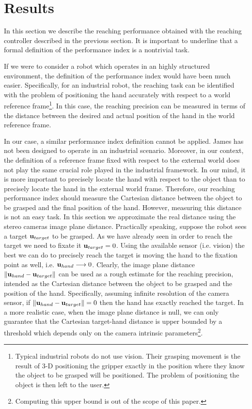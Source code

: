 \section{Results}
\label{sec:results}

In this section we describe the reaching performance obtained with 
the reaching controller described in the previous section. It is
important to underline that a formal definition of the performance 
index is a nontrivial task. 

If we were to consider a robot which operates in an highly structured
environment, the definition of the performance index would have been much easier. 
Specifically, for an industrial robot, the reaching task can be identified 
with the problem of positioning the hand accurately with respect to a world 
reference frame\footnote{Typical industrial robots do not use vision. Their 
grasping movement is the result of 3-D positioning the gripper exactly in the 
position where they know the object to be grasped will be positioned. The problem
of positioning the object is then left to the user.}. In this case, the reaching 
precision can be measured in terms of the distance between the desired and 
actual position of the hand in the world reference frame.
 
In our case, a similar performance index definition cannot be applied. James has not 
been designed to operate in an industrial scenario. Moreover, in our context, the definition of a reference 
frame fixed with respect to the external world does not play the same crucial 
role played in the industrial framework. In our mind, it is more important to 
precisely locate the hand with respect to the object than to precisely locate 
the hand in the external world frame. Therefore, our reaching performance index 
should measure the Cartesian distance between the object to be grasped and the final 
position of the hand. However, measuring this distance is not an easy task. In this section
we approximate the real distance using the stereo cameras image plane distance. Practically speaking, suppose the 
robot sees a target $\mathbf{u}_{target}$ to be grasped. As we have already seen in order to reach the 
target we need to fixate it $\mathbf{u}_{target} = 0$. Using the available sensor (i.e. vision) the best we can do to precisely reach the target is moving the hand to the fixation point as well, i.e. $
{\mathbf{u}_{hand}} \longrightarrow 0$. Clearly, the image plane distance $\| \mathbf{u}_{hand} - \mathbf{u}_{target} \|$ can be used as a rough estimate for the reaching precision, intended as  the
Cartesian distance between the object to be grasped and the position of the hand. Specifically,
assuming infinite resolution of the camera sensor, if $\| \mathbf{u}_{hand} - \mathbf{u}_{target}\| = 0$ then the hand has exactly reached the target. In a more realistic case,
when the image plane distance is null, we can only guarantee that the Cartesian target-hand distance
is upper bounded by a threshold which depends only on the camera intrinsic parameters\footnote{
Computing this upper bound is out of the scope of this paper.}. 

